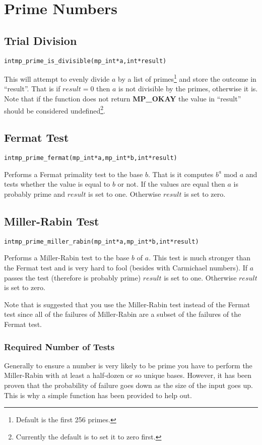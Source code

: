 \documentclass[synpaper]{book}
\begin{document}
\chapter{Prime Numbers}
\section{Trial Division}
\begin{alltt}
int mp_prime_is_divisible (mp_int * a, int *result)
\end{alltt}
This will attempt to evenly divide $a$ by a list of primes\footnote{Default is the first 256 primes.} and store the
outcome in ``result''.  That is if $result = 0$ then $a$ is not divisible by the primes, otherwise it is.  Note that
if the function does not return \textbf{MP\_OKAY} the value in ``result'' should be considered undefined\footnote{Currently
the default is to set it to zero first.}.

\section{Fermat Test}
\begin{alltt}
int mp_prime_fermat (mp_int * a, mp_int * b, int *result)
\end{alltt}
Performs a Fermat primality test to the base $b$.  That is it computes $b^a \mbox{ mod }a$ and tests whether the value is
equal to $b$ or not.  If the values are equal then $a$ is probably prime and $result$ is set to one.  Otherwise $result$
is set to zero.

\section{Miller-Rabin Test}
\begin{alltt}
int mp_prime_miller_rabin (mp_int * a, mp_int * b, int *result)
\end{alltt}
Performs a Miller-Rabin test to the base $b$ of $a$.  This test is much stronger than the Fermat test and is very hard to
fool (besides with Carmichael numbers).  If $a$ passes the test (therefore is probably prime) $result$ is set to one.
Otherwise $result$ is set to zero.

Note that is suggested that you use the Miller-Rabin test instead of the Fermat test since all of the failures of
Miller-Rabin are a subset of the failures of the Fermat test.

\subsection{Required Number of Tests}
Generally to ensure a number is very likely to be prime you have to perform the Miller-Rabin with at least a half-dozen
or so unique bases.  However, it has been proven that the probability of failure goes down as the size of the input goes up.
This is why a simple function has been provided to help out.
\end{document}
